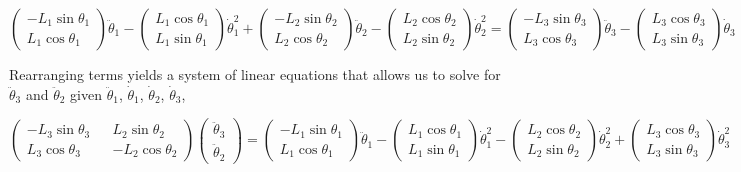 \documentclass[letterpaper]{article}
\begin{document}
\begin{equation*}
	\begin{pmatrix} - L_1 \sin \theta_1 \\ L_1 \cos \theta_1 \end{pmatrix} \ddot{\theta}_1 - \begin{pmatrix} L_1 \cos \theta_1 \\ L_1 \sin \theta_1 \end{pmatrix} \dot{\theta}_1^2 + \begin{pmatrix} - L_2 \sin \theta_2 \\ L_2 \cos \theta_2 \end{pmatrix} \ddot{\theta}_2 - \begin{pmatrix} L_2 \cos \theta_2 \\ L_2 \sin \theta_2 \end{pmatrix} \dot{\theta}_2^2 = \begin{pmatrix} - L_3 \sin \theta_3 \\ L_3 \cos \theta_3 \end{pmatrix} \ddot{\theta}_3 - \begin{pmatrix} L_3 \cos \theta_3 \\ L_3 \sin \theta_3 \end{pmatrix} \dot{\theta}_3
\end{equation*}

\noindent Rearranging terms yields a system of linear equations that allows us to solve for $\ddot{\theta}_3$ and $\ddot{\theta}_2$ given $\ddot{\theta}_1$, $\dot{\theta}_1$, $\dot{\theta}_2$, $\dot{\theta}_3$,

\begin{equation}
	\begin{pmatrix} -L_3 \sin \theta_3 && L_2 \sin \theta_2 \\ L_3 \cos \theta_3 && -L_2 \cos \theta_2 \end{pmatrix} \begin{pmatrix} \ddot{\theta}_3 \\ \ddot{\theta}_2 \end{pmatrix} = \begin{pmatrix} -L_1 \sin \theta_1 \\ L_1 \cos \theta_1 \end{pmatrix} \ddot{\theta}_1 - \begin{pmatrix} L_1 \cos \theta_1 \\ L_1 \sin \theta_1 \end{pmatrix} \dot{\theta}_1^2 - \begin{pmatrix} L_2 \cos \theta_2 \\ L_2 \sin \theta_2 \end{pmatrix} \dot{\theta}_2^2 + \begin{pmatrix} L_3 \cos \theta_3 \\ L_3 \sin \theta_3 \end{pmatrix} \dot{\theta}_3^2
\end{equation}
\end{document}
